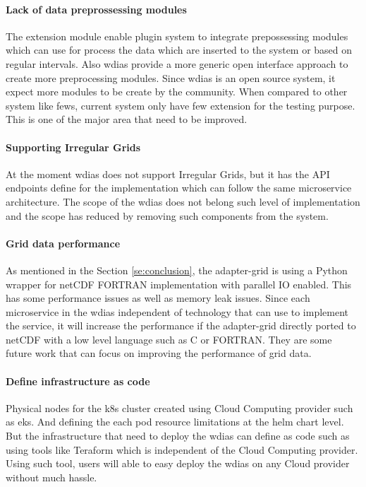\documentclass[conference]{IEEEtran}
\begin{document}
\paragraph{Lack of data preprossessing modules}
The extension module enable plugin system to integrate prepossessing modules which can use for process the data which are inserted to the system or based on regular intervals. Also \acrshort{wdias} provide a more generic open interface approach to create more preprocessing modules. Since \acrshort{wdias} is an open source system, it expect more modules to be create by the community. When compared to other system like \acrshort{fews}, current system only have few extension for the testing purpose. This is one of the major area that need to be improved.

\paragraph{Supporting Irregular Grids}
At the moment \acrshort{wdias} does not support Irregular Grids, but it has the API endpoints define for the implementation which can follow the same microservice architecture. The scope of the \acrshort{wdias} does not belong such level of implementation and the scope has reduced by removing such components from the system.

\paragraph{Grid data performance}
As mentioned in the Section \ref{se:conclusion}, the adapter-grid is using a Python wrapper for netCDF FORTRAN implementation with parallel IO enabled. This has some performance issues as well as memory leak issues. Since each microservice in the \acrshort{wdias} independent of technology that can use to implement the service, it will increase the performance if the adapter-grid directly ported to netCDF with a low level language such as C or FORTRAN. They are some future work that can focus on improving the performance of grid data.

\paragraph{Define infrastructure as code}
Physical nodes for the \acrshort{k8s} cluster created using Cloud Computing provider such as \acrshort{eks}. And defining the each pod resource limitations at the helm chart level. But the infrastructure that need to deploy the \acrshort{wdias} can define as code such as using tools like Teraform which is independent of the Cloud Computing provider. Using such tool, users will able to easy deploy the \acrshort{wdias} on any Cloud provider without much hassle.
\end{document}
